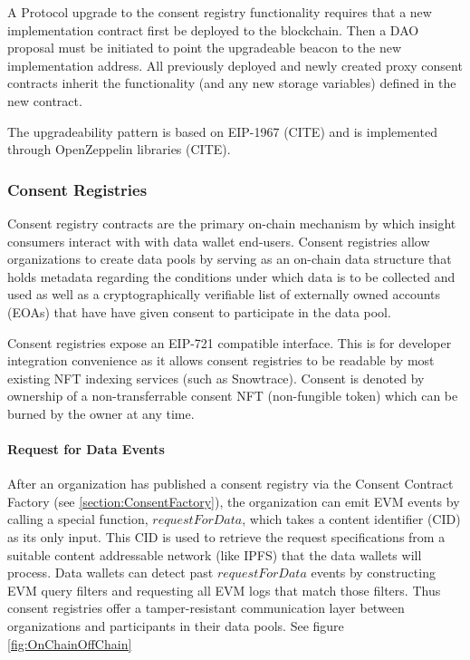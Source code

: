 A Protocol upgrade to the consent registry functionality requires that a new implementation contract first be deployed to the blockchain. Then a 
DAO proposal must be initiated to point the upgradeable beacon to the new implementation address. All previously deployed and newly created proxy 
consent contracts inherit the functionality (and any new storage variables) defined in the new contract.

The upgradeability pattern is based on EIP-1967 (CITE) and is implemented through OpenZeppelin libraries (CITE).

\subsubsection{Consent Registries}
\label{section:ConsentContract}


Consent registry contracts are the primary on-chain mechanism by which insight consumers interact with with data wallet end-users. Consent 
registries allow organizations to create data pools by serving as an on-chain data structure that holds metadata regarding the conditions 
under which data is to be collected and used as well as a cryptographically verifiable list of externally owned accounts (EOAs) that have
have given consent to participate in the data pool. 

Consent registries expose an EIP-721 compatible interface. This is for developer integration convenience as it allows consent registries to 
be readable by most existing NFT indexing services (such as Snowtrace). Consent is denoted by ownership of a non-transferrable consent NFT 
(non-fungible token) which can be burned by the owner at any time. 

\paragraph{Request for Data Events}


After an organization has published a consent registry via the Consent Contract Factory (see \ref{section:ConsentFactory}), the organization can emit
EVM events by calling a special function, $requestForData$, which takes a content identifier (CID) as its only input. This CID is used to 
retrieve the request specifications from a suitable content addressable network (like IPFS) that the data wallets will process. Data wallets can detect 
past $requestForData$ events by constructing EVM query filters and requesting all EVM logs that match those filters. Thus consent registries offer a 
tamper-resistant communication layer between organizations and participants in their data pools. See figure \ref{fig:OnChainOffChain}

